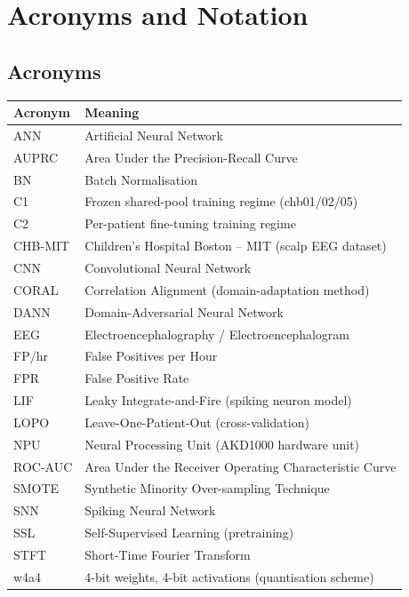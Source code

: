 \chapter*{Acronyms and Notation}

\section*{Acronyms}
\begin{table}[H]
\centering
\begin{tabular}{ll}
\toprule
Acronym & Meaning \\
\midrule
ANN & Artificial Neural Network \\
AUPRC & Area Under the Precision-Recall Curve \\
BN & Batch Normalisation \\
C1 & Frozen shared-pool training regime (chb01/02/05) \\
C2 & Per-patient fine-tuning training regime \\
CHB-MIT & Children's Hospital Boston -- MIT (scalp EEG dataset) \\
CNN & Convolutional Neural Network \\
CORAL & Correlation Alignment (domain-adaptation method) \\
DANN & Domain-Adversarial Neural Network \\
EEG & Electroencephalography / Electroencephalogram \\
FP/hr & False Positives per Hour \\
FPR & False Positive Rate \\
LIF & Leaky Integrate-and-Fire (spiking neuron model) \\
LOPO & Leave-One-Patient-Out (cross-validation) \\
NPU & Neural Processing Unit (AKD1000 hardware unit) \\
ROC-AUC & Area Under the Receiver Operating Characteristic Curve \\
SMOTE & Synthetic Minority Over-sampling Technique \\
SNN & Spiking Neural Network \\
SSL & Self-Supervised Learning (pretraining) \\
STFT & Short-Time Fourier Transform \\
w4a4 & 4-bit weights, 4-bit activations (quantisation scheme) \\
\bottomrule
\end{tabular}
\end{table}

